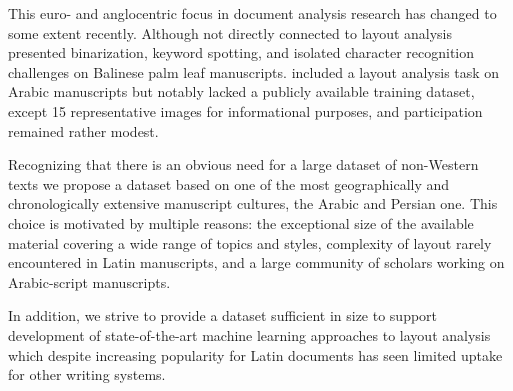 This euro- and anglocentric focus in document analysis research has changed to
some extent recently. Although not directly connected to layout analysis
\cite{burie2016icfhr} presented binarization, keyword spotting, and isolated
character recognition challenges on Balinese palm leaf manuscripts.
\cite{clausner2018icfhr} included a layout analysis task on Arabic manuscripts
but notably lacked a publicly available training dataset, except 15
representative images for informational purposes, and participation remained
rather modest.

Recognizing that there is an obvious need for a large dataset of non-Western
texts we propose a dataset based on one of the most geographically and
chronologically extensive manuscript cultures, the Arabic and Persian one. This
choice is motivated by multiple reasons: the exceptional size of the available
material covering a wide range of topics and styles, complexity of layout
rarely encountered in Latin manuscripts, and a large community of scholars
working on Arabic-script manuscripts.

In addition, we strive to provide a dataset sufficient in size to support
development of state-of-the-art machine learning ap\-proach\-es to layout analysis
which despite increasing popularity for Latin documents
\cite{barakat2018text,quiros2018multi,fink2018baseline} has seen limited uptake
for other writing systems.

